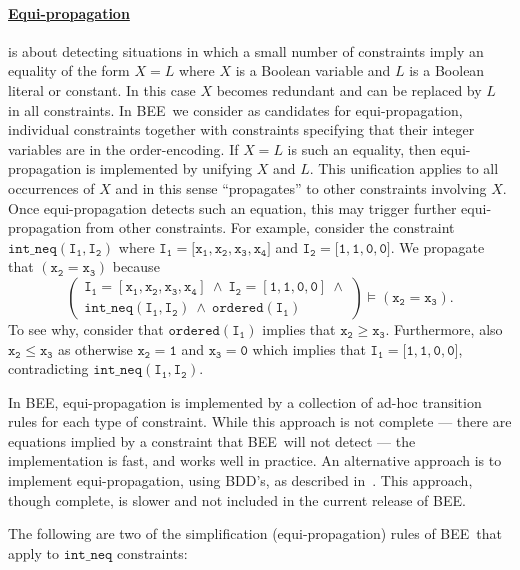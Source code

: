 \documentclass{tlp}
\newcommand{\bee}{\textsf{BEE}}
\begin{document}
\vspace{-3mm}
\paragraph{\underline{Equi-propagation}} is about detecting
situations in which a small number of constraints imply an equality of
the form $X=L$ where $X$ is a Boolean variable and $L$ is a Boolean
literal or constant. In this case $X$ becomes redundant
and can be replaced by $L$ in all constraints.
In \bee\ we consider as candidates for equi-propagation, individual
constraints together with constraints specifying that their integer
variables are in the order-encoding. If $X=L$ is such an equality,
then equi-propagation is implemented by unifying $X$ and $L$. This
unification applies to all occurrences of $X$ and in this sense
``propagates'' to other constraints involving $X$. Once
equi-propagation detects such an equation, this may trigger further
equi-propagation from other constraints.
For example, consider the constraint $\mathtt{int\_neq(I_1,I_2)}$
where $\mathtt{I_1=[x_1,x_2,x_3,x_4}]$ and
$\mathtt{I_2=[1,1,0,0}]$. We propagate that $\mathtt{(x_2=x_3)}$ because
\[
\left(
  \begin{array}{l}
    \mathtt{I_1=[x_1,x_2,x_3,x_4] ~\wedge~ I_2=[1,1,0,0] ~\wedge}\\
    \mathtt{int\_neq(I_1,I_2) ~\wedge~ ordered(I_1)}
  \end{array}
\right)\models \mathtt{(x_2=x_3)}.
\]
To see why, consider that $\mathtt{ordered(I_1)}$ implies that
$\mathtt{x_2\geq x_3}$. Furthermore, also $\mathtt{x_2\leq x_3}$ as
otherwise $\mathtt{x_2=1}$ and $\mathtt{x_3=0}$ which implies that
$\mathtt{I_1=[1,1,0,0}]$, contradicting $\mathtt{int\_neq(I_1,I_2)}$.


In \bee, equi-propagation is implemented by a collection of ad-hoc
transition rules for each type of constraint. While this approach is
not complete --- there are equations implied by a constraint that
\bee\ will not detect --- the implementation is fast, and works well
in practice.
An alternative approach is to implement equi-propagation, using BDD's,
as described in~\cite{Metodi2011}. This approach, though complete, is
slower and not included in the current release of \bee.

The following are two of the simplification (equi-propagation) rules
of \bee\ that apply to $\mathtt{int\_neq}$ constraints:
\end{document}
